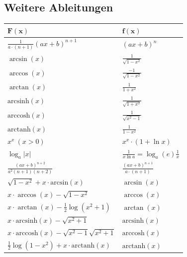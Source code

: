 \documentclass[a4paper,10pt]{article}
\begin{document}
				\subsection{Weitere Ableitungen}
				\begin{center}
					\begin{tabularx}{\linewidth}{>{\centering\arraybackslash}X>{\centering\arraybackslash}X}
						\toprule
						$\mathbf{F(x)}$                                     & $\mathbf{f(x)}$                          \\
						\midrule
						$\frac{1}{a\cdot (n+1)}(ax+b)^{n+1}$                & $(ax+b)^n$                               \\
						  
						$\arcsin(x)$                                        & $\frac{1}{\sqrt{1 - x^2}}$               \\
						$\arccos(x)$                                        & $\frac{-1}{\sqrt{1 - x^2}}$              \\
						$\arctan(x)$                                        & $\frac{1}{1 + x^2}$                      \\ 
						$\text{arcsinh}(x)$                                 & $\frac{1}{\sqrt{1 + x^2}}$               \\
						$\text{arccosh}(x) $                                & $\frac{1}{\sqrt{x^2 - 1}}$               \\
						$\text{arctanh}(x) $                                & $\frac{1}{1 - x^2}$                      \\ 
						$x^x \ (x > 0)$                                     & $x^x \cdot (1 + \ln x)$                  \\
						$\log_a|x|$                                         & $\frac{1}{x \ln a}=\log_a(e)\frac{1}{x}$ \\
						$\frac{(ax+b)^{n+2}}{a^2(n+1)(n+2)}$                & $\frac{(ax+b)^{n+1}}{a\cdot (n+1)}$      \\
						$\sqrt{1-x^2}+x\cdot \text{arcsin}(x)$              & $\arcsin(x)$                             \\
						$x\cdot \arccos(x)-\sqrt{1-x^2}$                    & $\arccos(x)$                             \\
						$x\cdot \arctan(x)-\frac{1}{2} \log(x^2+1)$         & $\arctan(x)$                             \\ 
						$x\cdot \text{arcsinh}(x)-\sqrt{x^2+1}$             & $\text{arcsinh}(x)$                      \\
						$x\cdot \text{arccosh}(x)-\sqrt{x^2-1}\sqrt{x^2+1}$ & $\text{arccosh}(x)$                      \\
						$\frac{1}{2} \log(1-x^2)+x\cdot \text{arctanh}(x)$  & $\text{arctanh}(x)$                      \\ 
						\bottomrule
					\end{tabularx}
				\end{center}
\end{document}
